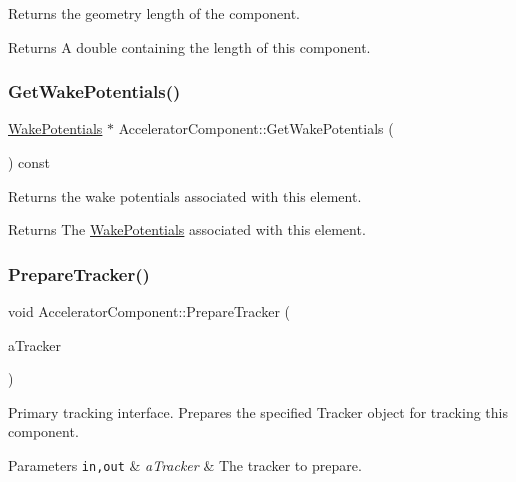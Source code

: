 Returns the geometry length of the component. \begin{DoxyReturn}{Returns}
A double containing the length of this component. 
\end{DoxyReturn}
\mbox{\label{classAcceleratorComponent_a167e52a18f62c9ceffd62ed0c3c079cd}} 
\subsubsection{\texorpdfstring{Get\+Wake\+Potentials()}{GetWakePotentials()}}
{\footnotesize\ttfamily \hyperlink{classWakePotentials}{Wake\+Potentials} $\ast$ Accelerator\+Component\+::\+Get\+Wake\+Potentials (\begin{DoxyParamCaption}{ }\end{DoxyParamCaption}) const\hspace{0.3cm}{\ttfamily [inline]}}

Returns the wake potentials associated with this element. \begin{DoxyReturn}{Returns}
The \hyperlink{classWakePotentials}{Wake\+Potentials} associated with this element. 
\end{DoxyReturn}
\mbox{\label{classAcceleratorComponent_ab897c54689ac946f40c3ad0716ddd4bb}} 
\subsubsection{\texorpdfstring{Prepare\+Tracker()}{PrepareTracker()}}
{\footnotesize\ttfamily void Accelerator\+Component\+::\+Prepare\+Tracker (\begin{DoxyParamCaption}\item[{\hyperlink{classComponentTracker}{Component\+Tracker} \&}]{a\+Tracker }\end{DoxyParamCaption})\hspace{0.3cm}{\ttfamily [virtual]}}

Primary tracking interface. Prepares the specified Tracker object for tracking this component. 
\begin{DoxyParams}[1]{Parameters}
\mbox{\tt in,out}  & {\em a\+Tracker} & The tracker to prepare. \\
\hline
\end{DoxyParams}


